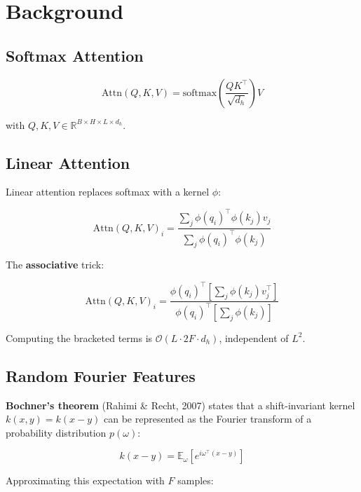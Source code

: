 \section{Background}

\subsection{Softmax Attention}

\begin{equation}
\text{Attn}(Q, K, V) = \text{softmax}\!\left(\frac{Q K^\top}{\sqrt{d_h}}\right) V
\end{equation}

with $Q, K, V \in \mathbb{R}^{B \times H \times L \times d_h}$.

\subsection{Linear Attention}

Linear attention replaces softmax with a kernel $\phi$:

\begin{equation}
\text{Attn}(Q, K, V)_i = \frac{\sum_j \phi(q_i)^\top \phi(k_j) v_j}{\sum_j \phi(q_i)^\top \phi(k_j)}
\end{equation}

The \textbf{associative} trick:

\begin{equation}
\text{Attn}(Q, K, V)_i = \frac{\phi(q_i)^\top \left[ \sum_j \phi(k_j) v_j^\top \right]}{\phi(q_i)^\top \left[ \sum_j \phi(k_j) \right]}
\end{equation}

Computing the bracketed terms is $\mathcal{O}(L \cdot 2F \cdot d_h)$, independent of $L^2$.

\subsection{Random Fourier Features}

\textbf{Bochner's theorem} (Rahimi \& Recht, 2007) states that a shift-invariant 
kernel $k(x, y) = k(x - y)$ can be represented as the Fourier transform of 
a probability distribution $p(\omega)$:

\begin{equation}
k(x - y) = \mathbb{E}_\omega [e^{i \omega^\top (x - y)}]
\end{equation}

Approximating this expectation with $F$ samples:

